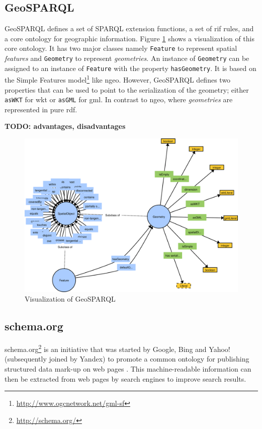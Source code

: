 \documentclass[draft,final]{vutinfth} %
\newcommand{\todo}[1]{{\color{red}\textbf{TODO: {#1}}}} %
\begin{document}
\subsection{GeoSPARQL}
GeoSPARQL defines a set of SPARQL extension functions, a set of \gls{rif} rules, and a core ontology for geographic information\cite{perry_ogc_2012}. Figure \ref{fig:related-work-geospatial-ontologies:geosparql} shows a visualization of this core ontology. It has two major classes namely \texttt{Feature} to represent spatial \textit{features} and \texttt{Geometry} to represent \textit{geometries}. An instance of \texttt{Geometry} can be assigned to an instance of \texttt{Feature} with the property \texttt{hasGeometry}. It is based on the Simple Features model\footnote{\url{http://www.ogcnetwork.net/gml-sf}} like \gls{ngeo}. However, GeoSPARQL defines two properties that can be used to point to the serialization of the geometry; either \texttt{asWKT} for \gls{wkt} or \texttt{asGML} for \gls{gml}. In contrast to \gls{ngeo}, where \textit{geometries} are represented in pure \gls{rdf}.

\todo{advantages, disadvantages}

\begin{figure}[h]
    \centering
    \includegraphics[width=1.0\textwidth]{graphics/vocabularies/geosparql.png}
    \caption{Visualization of GeoSPARQL}
    \label{fig:related-work-geospatial-ontologies:geosparql}
\end{figure}

\subsection{schema.org}
schema.org\footnote{\url{http://schema.org/}} is an initiative that was started by Google, Bing and Yahoo! (subsequently joined by Yandex) to promote a common ontology for publishing structured data mark-up on web pages \cite{guha_introducing_2011}. This machine-readable information can then be extracted from web pages by search engines to improve search results.
\end{document}
